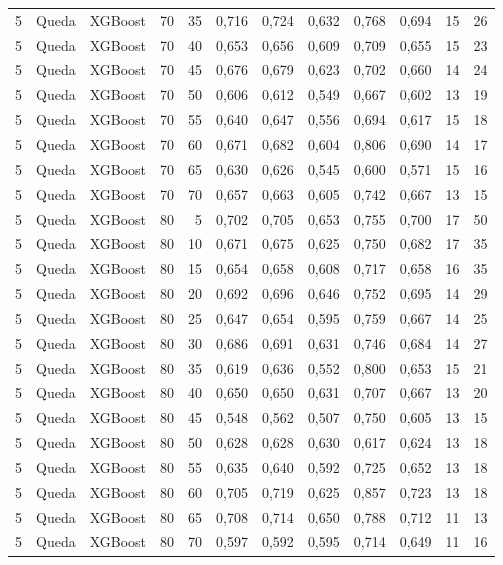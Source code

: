 \begin{longtable}{@{}rllrrrrrrrrr@{}}
5 & Queda & XGBoost & 70 & 35 & 0,716 & 0,724 & 0,632 & 0,768 & 0,694 & 15 & 26 \\
5 & Queda & XGBoost & 70 & 40 & 0,653 & 0,656 & 0,609 & 0,709 & 0,655 & 15 & 23 \\
5 & Queda & XGBoost & 70 & 45 & 0,676 & 0,679 & 0,623 & 0,702 & 0,660 & 14 & 24 \\
5 & Queda & XGBoost & 70 & 50 & 0,606 & 0,612 & 0,549 & 0,667 & 0,602 & 13 & 19 \\
5 & Queda & XGBoost & 70 & 55 & 0,640 & 0,647 & 0,556 & 0,694 & 0,617 & 15 & 18 \\
5 & Queda & XGBoost & 70 & 60 & 0,671 & 0,682 & 0,604 & 0,806 & 0,690 & 14 & 17 \\
5 & Queda & XGBoost & 70 & 65 & 0,630 & 0,626 & 0,545 & 0,600 & 0,571 & 15 & 16 \\
5 & Queda & XGBoost & 70 & 70 & 0,657 & 0,663 & 0,605 & 0,742 & 0,667 & 13 & 15 \\
5 & Queda & XGBoost & 80 & 5 & 0,702 & 0,705 & 0,653 & 0,755 & 0,700 & 17 & 50 \\
5 & Queda & XGBoost & 80 & 10 & 0,671 & 0,675 & 0,625 & 0,750 & 0,682 & 17 & 35 \\
5 & Queda & XGBoost & 80 & 15 & 0,654 & 0,658 & 0,608 & 0,717 & 0,658 & 16 & 35 \\
5 & Queda & XGBoost & 80 & 20 & 0,692 & 0,696 & 0,646 & 0,752 & 0,695 & 14 & 29 \\
5 & Queda & XGBoost & 80 & 25 & 0,647 & 0,654 & 0,595 & 0,759 & 0,667 & 14 & 25 \\
5 & Queda & XGBoost & 80 & 30 & 0,686 & 0,691 & 0,631 & 0,746 & 0,684 & 14 & 27 \\
5 & Queda & XGBoost & 80 & 35 & 0,619 & 0,636 & 0,552 & 0,800 & 0,653 & 15 & 21 \\
5 & Queda & XGBoost & 80 & 40 & 0,650 & 0,650 & 0,631 & 0,707 & 0,667 & 13 & 20 \\
5 & Queda & XGBoost & 80 & 45 & 0,548 & 0,562 & 0,507 & 0,750 & 0,605 & 13 & 15 \\
5 & Queda & XGBoost & 80 & 50 & 0,628 & 0,628 & 0,630 & 0,617 & 0,624 & 13 & 18 \\
5 & Queda & XGBoost & 80 & 55 & 0,635 & 0,640 & 0,592 & 0,725 & 0,652 & 13 & 18 \\
5 & Queda & XGBoost & 80 & 60 & 0,705 & 0,719 & 0,625 & 0,857 & 0,723 & 13 & 18 \\
5 & Queda & XGBoost & 80 & 65 & 0,708 & 0,714 & 0,650 & 0,788 & 0,712 & 11 & 13 \\
5 & Queda & XGBoost & 80 & 70 & 0,597 & 0,592 & 0,595 & 0,714 & 0,649 & 11 & 16 \\

\end{longtable}
